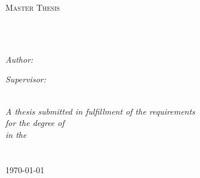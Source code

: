 \documentclass[
11pt, %
oneside, %
english, %
, %
headsepline, %
]{MastersDoctoralThesis} %
\author{Hasibullah \textsc{Sahibzada}} %
\begin{document}
\frontmatter %

\pagestyle{plain} %


\begin{titlepage}
\begin{center}

{\scshape\LARGE \univname\par}\vspace{1.5cm} %
\textsc{\Large Master Thesis}\\[0.5cm] %

\HRule \\[0.4cm] %
{\huge \bfseries \ttitle\par}\vspace{0.4cm} %
\HRule \\[1.5cm] %
 
\begin{minipage}[t]{0.4\textwidth}
\begin{flushleft} \large
\emph{Author:}\\
{\authorname} %
\end{flushleft}
\end{minipage}
\begin{minipage}[t]{0.4\textwidth}
\begin{flushright} \large
\emph{Supervisor:} \\
\href{http://www.ehornecker.de}{\supname} %
\end{flushright}
\end{minipage}\\[3cm]
 
\large \textit{A thesis submitted in fulfillment of the requirements\\ for the degree of \degreename}\\[0.3cm] %
\textit{in the}\\[0.4cm]
\groupname\\\deptname\\[2cm] %
 
{\large \today}\\[4cm] %
 
\vfill
\end{center}
\end{titlepage}
\end{document}
